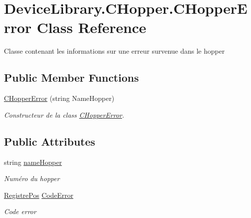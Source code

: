 \hypertarget{class_device_library_1_1_c_hopper_1_1_c_hopper_error}{}\section{Device\+Library.\+C\+Hopper.\+C\+Hopper\+Error Class Reference}
\label{class_device_library_1_1_c_hopper_1_1_c_hopper_error}


Classe contenant les informations sur une erreur survenue dans le hopper  


\subsection*{Public Member Functions}
\begin{DoxyCompactItemize}
\item 
\mbox{\hyperlink{class_device_library_1_1_c_hopper_1_1_c_hopper_error_a0603880c146f9101b3a4b94b817eba09}{C\+Hopper\+Error}} (string Name\+Hopper)
\begin{DoxyCompactList}\small\item\em Constructeur de la class \mbox{\hyperlink{class_device_library_1_1_c_hopper_1_1_c_hopper_error}{C\+Hopper\+Error}}. \end{DoxyCompactList}\end{DoxyCompactItemize}
\subsection*{Public Attributes}
\begin{DoxyCompactItemize}
\item 
string \mbox{\hyperlink{class_device_library_1_1_c_hopper_1_1_c_hopper_error_a0b9f9b66126ab5bb7d8fab1cb6a74370}{name\+Hopper}}
\begin{DoxyCompactList}\small\item\em Numéro du hopper \end{DoxyCompactList}\item 
\mbox{\hyperlink{class_device_library_1_1_c_hopper_afce8f2089a688f1d3fdf9db91242fb01}{Registre\+Pos}} \mbox{\hyperlink{class_device_library_1_1_c_hopper_1_1_c_hopper_error_aed857b78c9f0e03b364b35a9cebe58d1}{Code\+Error}}
\begin{DoxyCompactList}\small\item\em Code error \end{DoxyCompactList}\end{DoxyCompactItemize}


